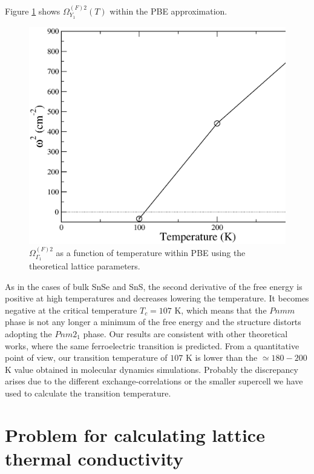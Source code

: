 Figure \ref{freq-transition-mono} shows $\Omega^{(F)2}_{Y_{1}}(T)$ within the PBE approximation.
\begin{figure}[h]
\includegraphics[width=\linewidth]{Figures/freq-mono.eps}
\caption[Phonon collapse in monolayer SnSe.]{$\Omega^{(F)2}_{\Gamma_{1}}$ as a function of temperature within PBE 
using the theoretical lattice parameters.}
\label{freq-transition-mono}
\end{figure}
As in the cases of bulk SnSe and SnS, the second derivative of the free energy is positive at high temperatures and 
decreases lowering the temperature. It becomes negative at the critical temperature 
$T_{c}=107$ K, which means that the $Pnmm$ phase is not any longer a minimum of the free energy and the structure 
distorts adopting the $Pnm2_{1}$ phase. Our results are consistent with other theoretical 
works\cite{mehboudi2016structural,barraza2018tuning,fei2016ferroelectricity}, where the same ferroelectric 
transition is predicted. From a quantitative point of view, our transition temperature of $107$ K is lower than the 
$\simeq180-200$ K value obtained in molecular dynamics simulations\cite{mehboudi2016structural,barraza2018tuning}. 
Probably the discrepancy arises due to the different exchange-correlations or the smaller supercell we have used to 
calculate the transition temperature.

\section{Problem for calculating lattice thermal conductivity}

